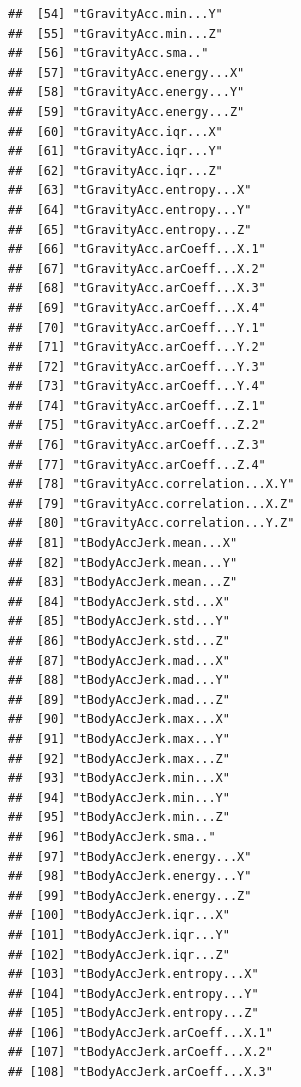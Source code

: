 \documentclass[
]{article}
\begin{document}
\begin{verbatim}
##  [54] "tGravityAcc.min...Y"                 
##  [55] "tGravityAcc.min...Z"                 
##  [56] "tGravityAcc.sma.."                   
##  [57] "tGravityAcc.energy...X"              
##  [58] "tGravityAcc.energy...Y"              
##  [59] "tGravityAcc.energy...Z"              
##  [60] "tGravityAcc.iqr...X"                 
##  [61] "tGravityAcc.iqr...Y"                 
##  [62] "tGravityAcc.iqr...Z"                 
##  [63] "tGravityAcc.entropy...X"             
##  [64] "tGravityAcc.entropy...Y"             
##  [65] "tGravityAcc.entropy...Z"             
##  [66] "tGravityAcc.arCoeff...X.1"           
##  [67] "tGravityAcc.arCoeff...X.2"           
##  [68] "tGravityAcc.arCoeff...X.3"           
##  [69] "tGravityAcc.arCoeff...X.4"           
##  [70] "tGravityAcc.arCoeff...Y.1"           
##  [71] "tGravityAcc.arCoeff...Y.2"           
##  [72] "tGravityAcc.arCoeff...Y.3"           
##  [73] "tGravityAcc.arCoeff...Y.4"           
##  [74] "tGravityAcc.arCoeff...Z.1"           
##  [75] "tGravityAcc.arCoeff...Z.2"           
##  [76] "tGravityAcc.arCoeff...Z.3"           
##  [77] "tGravityAcc.arCoeff...Z.4"           
##  [78] "tGravityAcc.correlation...X.Y"       
##  [79] "tGravityAcc.correlation...X.Z"       
##  [80] "tGravityAcc.correlation...Y.Z"       
##  [81] "tBodyAccJerk.mean...X"               
##  [82] "tBodyAccJerk.mean...Y"               
##  [83] "tBodyAccJerk.mean...Z"               
##  [84] "tBodyAccJerk.std...X"                
##  [85] "tBodyAccJerk.std...Y"                
##  [86] "tBodyAccJerk.std...Z"                
##  [87] "tBodyAccJerk.mad...X"                
##  [88] "tBodyAccJerk.mad...Y"                
##  [89] "tBodyAccJerk.mad...Z"                
##  [90] "tBodyAccJerk.max...X"                
##  [91] "tBodyAccJerk.max...Y"                
##  [92] "tBodyAccJerk.max...Z"                
##  [93] "tBodyAccJerk.min...X"                
##  [94] "tBodyAccJerk.min...Y"                
##  [95] "tBodyAccJerk.min...Z"                
##  [96] "tBodyAccJerk.sma.."                  
##  [97] "tBodyAccJerk.energy...X"             
##  [98] "tBodyAccJerk.energy...Y"             
##  [99] "tBodyAccJerk.energy...Z"             
## [100] "tBodyAccJerk.iqr...X"                
## [101] "tBodyAccJerk.iqr...Y"                
## [102] "tBodyAccJerk.iqr...Z"                
## [103] "tBodyAccJerk.entropy...X"            
## [104] "tBodyAccJerk.entropy...Y"            
## [105] "tBodyAccJerk.entropy...Z"            
## [106] "tBodyAccJerk.arCoeff...X.1"          
## [107] "tBodyAccJerk.arCoeff...X.2"          
## [108] "tBodyAccJerk.arCoeff...X.3"          

\end{verbatim}
\end{document}
